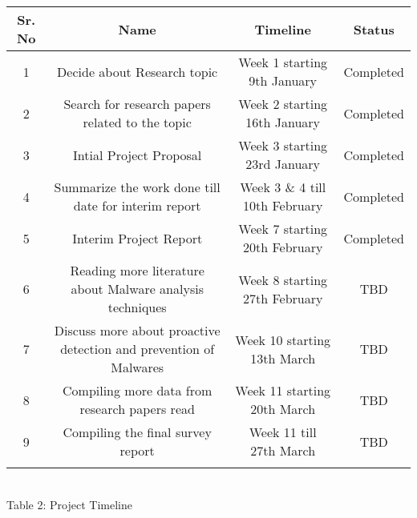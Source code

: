 \documentclass[16pt]{article}
\begin{document}
	\begin{center}
		\begin{tabular}{cccc}
			\hline
			Sr. No & Name & Timeline & Status\\
			\hline
			1 & Decide about Research topic  & Week 1 starting 9th January & Completed\\
			\hline
			2 & Search for research papers related to the topic & Week 2 starting 16th January & Completed\\
			\hline
			3 & Intial Project Proposal & Week 3 starting 23rd January & Completed\\
			\hline
			4 & Summarize the work done till date for interim report & Week 3 \& 4 till 10th February & Completed\\
			\hline
			5 & Interim Project Report  & Week 7 starting 20th February  & Completed\\
			\hline
			6 & Reading more literature about Malware analysis techniques & Week 8 starting 27th February & TBD\\
			\hline
			7 & Discuss more about proactive detection and prevention of Malwares & Week 10 starting 13th March & TBD\\
			\hline
			8 & Compiling more data from research papers read & Week 11 starting 20th March & TBD\\
			\hline
			9 & Compiling the final survey report & Week 11 till 27th March & TBD\\
			\hline\\
		\end{tabular}\\
	\caption{Table 2: Project Timeline} \label{table: Project Timeline}
	\end{center}


\end{document}

